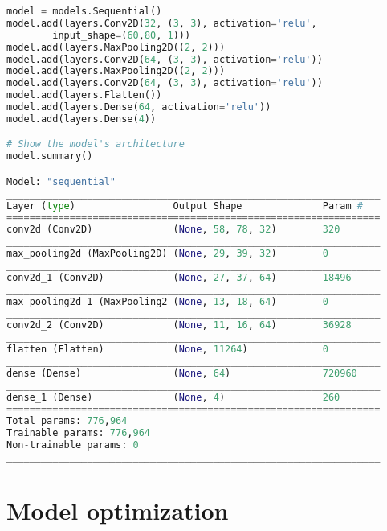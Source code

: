 \begin{lstlisting}[language=Python]
model = models.Sequential()
model.add(layers.Conv2D(32, (3, 3), activation='relu', 
        input_shape=(60,80, 1)))
model.add(layers.MaxPooling2D((2, 2)))
model.add(layers.Conv2D(64, (3, 3), activation='relu'))
model.add(layers.MaxPooling2D((2, 2)))
model.add(layers.Conv2D(64, (3, 3), activation='relu'))
model.add(layers.Flatten())
model.add(layers.Dense(64, activation='relu'))
model.add(layers.Dense(4))

# Show the model's architecture
model.summary()

Model: "sequential"
_________________________________________________________________
Layer (type)                 Output Shape              Param #   
=================================================================
conv2d (Conv2D)              (None, 58, 78, 32)        320       
_________________________________________________________________
max_pooling2d (MaxPooling2D) (None, 29, 39, 32)        0         
_________________________________________________________________
conv2d_1 (Conv2D)            (None, 27, 37, 64)        18496     
_________________________________________________________________
max_pooling2d_1 (MaxPooling2 (None, 13, 18, 64)        0         
_________________________________________________________________
conv2d_2 (Conv2D)            (None, 11, 16, 64)        36928     
_________________________________________________________________
flatten (Flatten)            (None, 11264)             0         
_________________________________________________________________
dense (Dense)                (None, 64)                720960    
_________________________________________________________________
dense_1 (Dense)              (None, 4)                 260       
=================================================================
Total params: 776,964
Trainable params: 776,964
Non-trainable params: 0
_________________________________________________________________
\end{lstlisting}


\section{ Model optimization}

